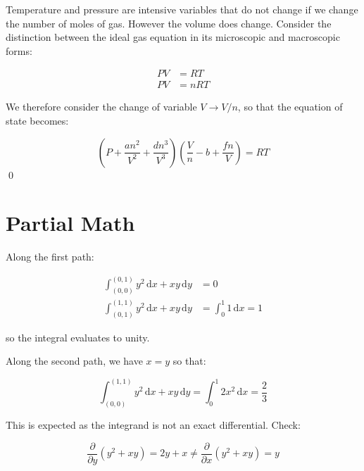 \documentclass[12pt]{article}
\begin{document}
Temperature and pressure are intensive variables that do not change if we change the number of moles of gas. However the volume does change. Consider the distinction between the ideal gas equation in its microscopic and macroscopic forms:

\begin{equation}
    \begin{split}
        PV &= RT \\
        PV &= nRT
    \end{split}
\end{equation}

We therefore consider the change of variable $V \to V/n$, so that the equation of state becomes:

\begin{equation}
    \left( P + \frac{an^{2}}{V^{2}} + \frac{dn^{3}}{V^{3}} \right) \left( \frac{V}{n} - b + \frac{fn}{V} \right) = RT
\end{equation}
\qed


\pagebreak
\section*{Partial Math}



Along the first path:

\begin{equation}
    \begin{split}
        \int_{(0, 0)}^{(0, 1)} y^{2} \, \mathrm{d}x + xy \, \mathrm{d}y &= 0 \\
        \int_{(0, 1)}^{(1, 1)} y^{2} \, \mathrm{d}x + xy \, \mathrm{d}y &= \int_{0}^{1} 1 \, \mathrm{d}x = 1
    \end{split}
\end{equation}

so the integral evaluates to unity.

Along the second path, we have $x = y$ so that:

\begin{equation}
    \int_{(0, 0)}^{(1, 1)} y^{2} \, \mathrm{d}x + xy \, \mathrm{d}y = \int_{0}^{1} 2x^{2} \, \mathrm{d}x = \frac{2}{3}
\end{equation}

This is expected as the integrand is not an exact differential. Check:

\begin{equation}
    \frac{\partial}{\partial y} (y^{2} + xy) = 2y + x \neq \frac{\partial}{\partial x} (y^{2} + xy) = y
\end{equation}
\end{document}
